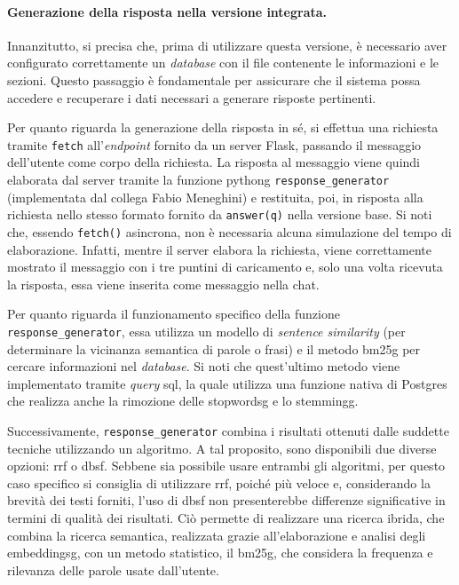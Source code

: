 \paragraph{Generazione della risposta nella versione integrata.} Innanzitutto, si precisa che, prima di utilizzare questa versione, è necessario aver configurato correttamente un \emph{database} con il file contenente le informazioni e 
le sezioni. Questo passaggio è fondamentale per assicurare che il sistema possa accedere e recuperare i dati necessari a generare risposte pertinenti.

Per quanto riguarda la generazione della risposta in sé, si effettua una richiesta tramite \texttt{fetch} all'\emph{endpoint} fornito da un server Flask, passando il messaggio dell'utente come corpo della richiesta. 
La risposta al messaggio viene quindi elaborata dal server tramite la funzione \gls{pythong} \texttt{response\_generator} (implementata dal collega Fabio Meneghini) e restituita, poi, in risposta alla richiesta 
nello stesso formato fornito da \texttt{answer(q)} nella versione base.
Si noti che, essendo \texttt{fetch()} asincrona, non è necessaria alcuna simulazione del tempo di elaborazione. Infatti, mentre il server elabora la richiesta, viene correttamente 
mostrato il messaggio con i tre puntini di caricamento e, solo una volta ricevuta la risposta, essa viene inserita come messaggio nella chat.

Per quanto riguarda il funzionamento specifico della funzione \texttt{response\_generator}, essa utilizza un modello di \emph{sentence similarity} (per determinare la vicinanza semantica di parole o frasi) e il metodo \gls{bm25g} per cercare informazioni 
nel \emph{database}. 
Si noti che quest'ultimo metodo viene implementato tramite \emph{query} \gls{sql}, la quale utilizza una funzione nativa di Postgres che realizza anche la rimozione delle \gls{stopwordsg} e lo \gls{stemmingg}.

Successivamente, \texttt{response\_generator} combina i risultati ottenuti dalle suddette tecniche utilizzando un algoritmo. A tal proposito, sono disponibili due diverse opzioni: \gls{rrf} o \gls{dbsf}.
Sebbene sia possibile usare entrambi gli algoritmi, per questo caso specifico si consiglia di utilizzare \gls{rrf}, poiché più veloce e, considerando la brevità dei testi forniti, 
l'uso di \gls{dbsf} non presenterebbe differenze significative in termini di qualità dei risultati.
Ciò permette di realizzare una ricerca ibrida, che combina la ricerca semantica, realizzata grazie all'elaborazione e analisi degli \gls{embeddingsg}, con un metodo statistico, il \gls{bm25g}, che considera la frequenza e 
rilevanza delle parole usate dall'utente.   


